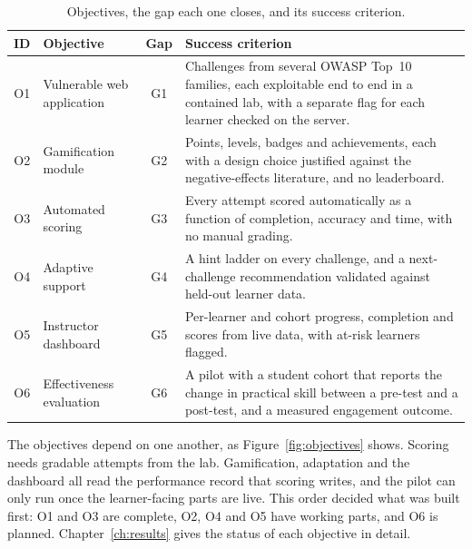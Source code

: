 \begin{table}[!htbp]
\centering
\caption{Objectives, the gap each one closes, and its success criterion.}
\label{tab:objectives}
\tablefont
\begin{tabularx}{\linewidth}{@{}c P{3.3cm} c L@{}}
\toprule
\textbf{ID} & \textbf{Objective} & \textbf{Gap} & \textbf{Success criterion} \\
\midrule
O1 & Vulnerable web application & G1 & Challenges from several OWASP Top~10 families, each exploitable end to end in a contained lab, with a separate flag for each learner checked on the server. \\
O2 & Gamification module & G2 & Points, levels, badges and achievements, each with a design choice justified against the negative-effects literature, and no leaderboard. \\
O3 & Automated scoring & G3 & Every attempt scored automatically as a function of completion, accuracy and time, with no manual grading. \\
O4 & Adaptive support & G4 & A hint ladder on every challenge, and a next-challenge recommendation validated against held-out learner data. \\
O5 & Instructor dashboard & G5 & Per-learner and cohort progress, completion and scores from live data, with at-risk learners flagged. \\
O6 & Effectiveness evaluation & G6 & A pilot with a student cohort that reports the change in practical skill between a pre-test and a post-test, and a measured engagement outcome. \\
\bottomrule
\end{tabularx}
\end{table}

The objectives depend on one another, as Figure~\ref{fig:objectives} shows. Scoring needs gradable attempts from the lab. Gamification, adaptation and the dashboard all read the performance record that scoring writes, and the pilot can only run once the learner-facing parts are live. This order decided what was built first: O1 and O3 are complete, O2, O4 and O5 have working parts, and O6 is planned. Chapter~\ref{ch:results} gives the status of each objective in detail.

